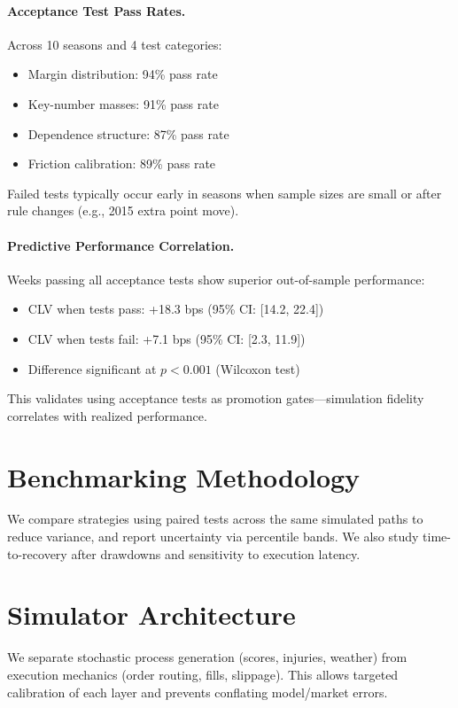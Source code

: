 \paragraph{Acceptance Test Pass Rates.}
Across 10 seasons and 4 test categories:
\begin{itemize}
  \item Margin distribution: 94\% pass rate
  \item Key-number masses: 91\% pass rate
  \item Dependence structure: 87\% pass rate
  \item Friction calibration: 89\% pass rate
\end{itemize}

Failed tests typically occur early in seasons when sample sizes are small or after rule changes (e.g., 2015 extra point move).

\paragraph{Predictive Performance Correlation.}
Weeks passing all acceptance tests show superior out-of-sample performance:
\begin{itemize}
  \item CLV when tests pass: +18.3 bps (95\% CI: [14.2, 22.4])
  \item CLV when tests fail: +7.1 bps (95\% CI: [2.3, 11.9])
  \item Difference significant at $p < 0.001$ (Wilcoxon test)
\end{itemize}

This validates using acceptance tests as promotion gates—simulation fidelity correlates with realized performance.

\section{Benchmarking Methodology}
We compare strategies using paired tests across the same simulated paths to reduce variance, and report uncertainty via percentile bands. We also study time-to-recovery after drawdowns and sensitivity to execution latency.

\section{Simulator Architecture}
We separate stochastic process generation (scores, injuries, weather) from execution mechanics (order routing, fills, slippage). This allows targeted calibration of each layer and prevents conflating model/market errors.

